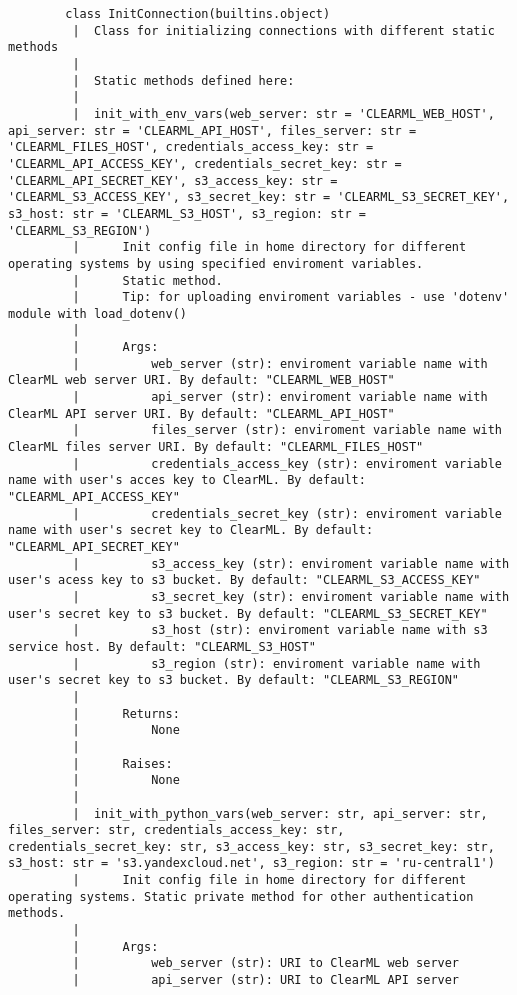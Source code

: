 \begin{lstlisting}
		class InitConnection(builtins.object)
		 |  Class for initializing connections with different static methods
		 |  
		 |  Static methods defined here:
		 |  
		 |  init_with_env_vars(web_server: str = 'CLEARML_WEB_HOST', api_server: str = 'CLEARML_API_HOST', files_server: str = 'CLEARML_FILES_HOST', credentials_access_key: str = 'CLEARML_API_ACCESS_KEY', credentials_secret_key: str = 'CLEARML_API_SECRET_KEY', s3_access_key: str = 'CLEARML_S3_ACCESS_KEY', s3_secret_key: str = 'CLEARML_S3_SECRET_KEY', s3_host: str = 'CLEARML_S3_HOST', s3_region: str = 'CLEARML_S3_REGION')
		 |      Init config file in home directory for different operating systems by using specified enviroment variables.
		 |      Static method.
		 |      Tip: for uploading enviroment variables - use 'dotenv' module with load_dotenv()
		 |      
		 |      Args:
		 |          web_server (str): enviroment variable name with ClearML web server URI. By default: "CLEARML_WEB_HOST"
		 |          api_server (str): enviroment variable name with ClearML API server URI. By default: "CLEARML_API_HOST"
		 |          files_server (str): enviroment variable name with ClearML files server URI. By default: "CLEARML_FILES_HOST"
		 |          credentials_access_key (str): enviroment variable name with user's acces key to ClearML. By default: "CLEARML_API_ACCESS_KEY"
		 |          credentials_secret_key (str): enviroment variable name with user's secret key to ClearML. By default: "CLEARML_API_SECRET_KEY"
		 |          s3_access_key (str): enviroment variable name with user's acess key to s3 bucket. By default: "CLEARML_S3_ACCESS_KEY"
		 |          s3_secret_key (str): enviroment variable name with user's secret key to s3 bucket. By default: "CLEARML_S3_SECRET_KEY"
		 |          s3_host (str): enviroment variable name with s3 service host. By default: "CLEARML_S3_HOST"
		 |          s3_region (str): enviroment variable name with user's secret key to s3 bucket. By default: "CLEARML_S3_REGION"
		 |      
		 |      Returns:
		 |          None
		 |      
		 |      Raises:
		 |          None
		 |  
		 |  init_with_python_vars(web_server: str, api_server: str, files_server: str, credentials_access_key: str, credentials_secret_key: str, s3_access_key: str, s3_secret_key: str, s3_host: str = 's3.yandexcloud.net', s3_region: str = 'ru-central1')
		 |      Init config file in home directory for different operating systems. Static private method for other authentication methods.
		 |      
		 |      Args:
		 |          web_server (str): URI to ClearML web server
		 |          api_server (str): URI to ClearML API server

\end{lstlisting}

